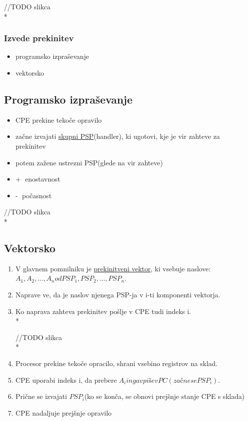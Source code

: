 \documentclass[
  slovene,
  a4paper
]{book}
\begin{document}
//TODO slikca\\*

\subsubsection{Izvede prekinitev}
\begin{itemize}
  \item programsko izpraševanje
  \item vektorsko
\end{itemize}

\subsection{Programsko izpraševanje}
\begin{itemize}
  \item CPE prekine tekoče opravilo
  \item začne izvajati \underline{skupni PSP}(handler), ki ugotovi, kje je vir zahteve za prekinitev
  \item potem zažene ustrezni PSP(glede na vir zahteve)
  \item \textcircled{+} enostavnost
  \item \textcircled{-} počasnost
\end{itemize}

//TODO slikca\\*

\subsection{Vektorsko}
\begin{enumerate}
  \item V glavnem pomnilniku je \underline{prekinitveni vektor}, ki vsebuje naslove: \begin{math} A_1, A_2,...,A_n od PSP_1, PSP_2,..., PSP_n\end{math}.
  \item Naprave ve, da je naslov njenega PSP-ja v i-ti komponenti vektorja.
  \item Ko naprava zahteva prekinitev pošlje v CPE tudi indeks i.\\*

//TODO slikca\\*

  \item Procesor prekine tekoče opracilo, shrani vsebino registrov na sklad.
  \item CPE uporabi indeks i, da prebere \begin{math}A_i in ga vpiše v PC(začne se PSP_i).\end{math}
  \item Prične se izvajati \begin{math}PSP_i\end{math}(ko se konča, se obnovi prejšnje stanje CPE s sklada)
  \item CPE nadaljuje prejšnje opravilo
\end{enumerate}
\end{document}
